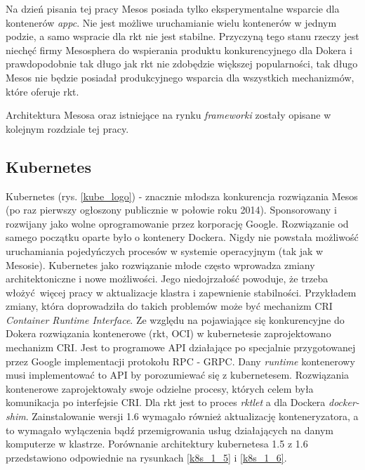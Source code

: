 \documentclass[10pt,a4paper,titlepage,twoside]{report}
\begin{document}
Na dzień pisania tej pracy Mesos posiada tylko eksperymentalne wsparcie dla kontenerów \textit{appc}. Nie jest możliwe uruchamianie wielu kontenerów w jednym podzie, a samo wspracie dla rkt nie jest stabilne. Przyczyną tego stanu rzeczy jest niechęć firmy Mesosphera do wspierania produktu konkurencyjnego dla Dokera i prawdopodobnie tak długo jak rkt nie zdobędzie większej popularności, tak długo Mesos nie będzie posiadał produkcyjnego wsparcia dla wszystkich mechanizmów, które oferuje rkt.

Architektura Mesosa oraz istniejące na rynku \textit{frameworki} zostały opisane w kolejnym rozdziale tej pracy. 

\subsection{Kubernetes}

Kubernetes (rys. \ref{kube_logo}) - znacznie młodsza konkurencja rozwiązania Mesos (po raz pierwszy ogłoszony publicznie w połowie roku 2014). Sponsorowany i rozwijany jako wolne oprogramowanie przez korporację Google. Rozwiązanie od samego początku oparte było o kontenery Dockera. Nigdy nie powstała możliwość uruchamiania pojedyńczych procesów w systemie operacyjnym (tak jak w Mesosie). Kubernetes jako rozwiązanie młode często wprowadza zmiany architektoniczne i nowe możliwości. Jego niedojrzałość powoduje, że trzeba włożyć więcej pracy w aktualizacje klastra i zapewnienie stabilności. Przykładem zmiany, która doprowadziła do takich problemów może być mechanizm CRI \textit{Container Runtime Interface}. Ze względu na pojawiające się konkurencyjne do Dokera rozwiązania kontenerowe (rkt, OCI) w kubernetesie zaprojektowano mechanizm CRI. Jest to programowe API działające po specjalnie przygotowanej przez Google implementacji protokołu RPC - GRPC. Dany \textit{runtime} kontenerowy musi implementować to API by porozumiewać się z kubernetesem. Rozwiązania kontenerowe zaprojektowały swoje odzielne procesy, których celem była komunikacja po interfejsie CRI. Dla rkt jest to proces \textit{rktlet} a dla Dockera \textit{docker-shim}. Zainstalowanie wersji 1.6 wymagało również aktualizację konteneryzatora, a to wymagało wyłączenia bądź przemigrowania usług działających na danym komputerze w klastrze. Porównanie architektury kubernetesa 1.5 z 1.6 przedstawiono odpowiednie na rysunkach \ref{k8s_1_5} i \ref{k8s_1_6}.
\end{document}

